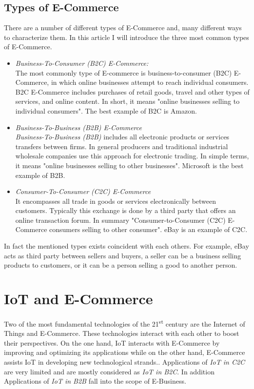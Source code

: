 \documentclass[10pt,journal,compsoc]{IEEEtran}
\begin{document}
	\subsection{Types of E-Commerce}
	There are a number of different types of E-Commerce and, many different ways to characterize them. In this article I will introduce the three most common types of E-Commerce.
	\begin{itemize}
		\item \emph{Business-To-Consumer (B2C) E-Commerce: }\\
		The most commonly type of E-commerce is business-to-consumer (B2C)
		E-Commerce, in which online businesses attempt to reach individual consumers. B2C
		E-Commerce includes purchases of retail goods, travel and other types of services, and
		online content\cite{ecbook2017}. In short, it means "online businesses selling to individual consumers". The best example of B2C is Amazon.
		\item \emph{Business-To-Business (B2B) E-Commerce}\\
		\emph{Business-To-Business (B2B)} includes all electronic products or services transfers between firms. In general
		producers and traditional industrial wholesale companies use this approach for electronic trading. In simple terms, it means "online businesses selling to other businesses"\cite{ecbook2017}. Microsoft is the best example of B2B.
		\item \emph{Consumer-To-Consumer (C2C) E-Commerce}\\
		It encompasses all trade in goods or services electronically between customers.
		Typically this exchange is done by a third party that offers an online transaction forum\cite{jain2021overview}. In summary "Consumer-to-Consumer (C2C) E-Commerce consumers selling to other consumer".\cite{ecbook2017} eBay is an example of C2C.
	\end{itemize}
	In fact the mentioned types exists coincident with each others. For example, eBay acts as third party between sellers and buyers, a seller can be a business selling products to customers, or it can be a person selling a good to another person.

	\section{IoT and E-Commerce}
	\cite{trevlopoulou2018internet}Two of the most fundamental technologies of the 21\textsuperscript{st} century are the Internet of
	Things and E-Commerce. These technologies interact with each other to boost their perspectives. On the one hand, IoT interacts with E-Commerce by improving and optimizing its applications while on the other hand, E-Commerce assists IoT in developing new technological strands.\cite{trevlopoulou2018internet}. Applications of \emph{IoT in C2C} are very limited and are mostly considered as \emph{IoT in B2C}. In addition Applications of \emph{IoT in B2B} fall into the scope of E-Business.
\end{document}
